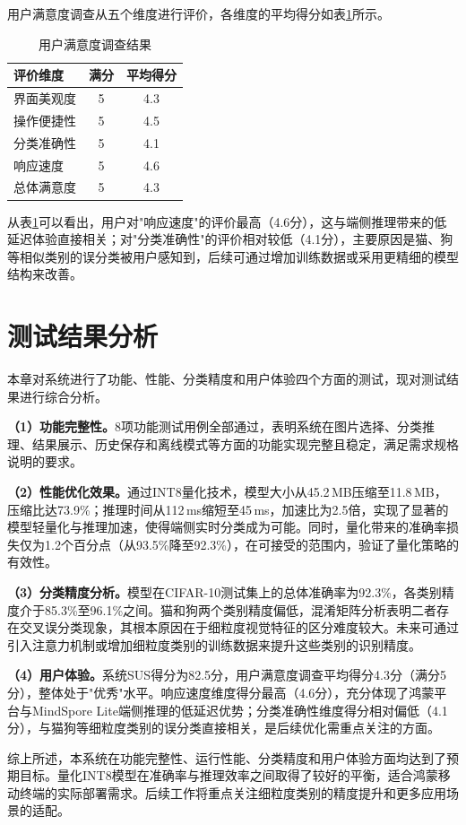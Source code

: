 用户满意度调查从五个维度进行评价，各维度的平均得分如表\ref{tab:satisfaction}所示。

\begin{table}[htbp]
\centering
\caption{用户满意度调查结果}
\label{tab:satisfaction}
\begin{tabular}{lcc}
\toprule
评价维度 & 满分 & 平均得分 \\
\midrule
界面美观度 & 5 & 4.3 \\
操作便捷性 & 5 & 4.5 \\
分类准确性 & 5 & 4.1 \\
响应速度 & 5 & 4.6 \\
总体满意度 & 5 & 4.3 \\
\bottomrule
\end{tabular}
\end{table}

从表\ref{tab:satisfaction}可以看出，用户对"响应速度"的评价最高（4.6分），这与端侧推理带来的低延迟体验直接相关；对"分类准确性"的评价相对较低（4.1分），主要原因是猫、狗等相似类别的误分类被用户感知到，后续可通过增加训练数据或采用更精细的模型结构来改善。

\section{测试结果分析}

本章对系统进行了功能、性能、分类精度和用户体验四个方面的测试，现对测试结果进行综合分析。

\textbf{（1）功能完整性。}8项功能测试用例全部通过，表明系统在图片选择、分类推理、结果展示、历史保存和离线模式等方面的功能实现完整且稳定，满足需求规格说明的要求。

\textbf{（2）性能优化效果。}通过INT8量化技术，模型大小从45.2\,MB压缩至11.8\,MB，压缩比达73.9\%；推理时间从112\,ms缩短至45\,ms，加速比为2.5倍，实现了显著的模型轻量化与推理加速，使得端侧实时分类成为可能。同时，量化带来的准确率损失仅为1.2个百分点（从93.5\%降至92.3\%），在可接受的范围内，验证了量化策略的有效性。

\textbf{（3）分类精度分析。}模型在CIFAR-10测试集上的总体准确率为92.3\%，各类别精度介于85.3\%至96.1\%之间。猫和狗两个类别精度偏低，混淆矩阵分析表明二者存在交叉误分类现象，其根本原因在于细粒度视觉特征的区分难度较大。未来可通过引入注意力机制或增加细粒度类别的训练数据来提升这些类别的识别精度。

\textbf{（4）用户体验。}系统SUS得分为82.5分，用户满意度调查平均得分4.3分（满分5分），整体处于"优秀"水平。响应速度维度得分最高（4.6分），充分体现了鸿蒙平台与MindSpore Lite端侧推理的低延迟优势；分类准确性维度得分相对偏低（4.1分），与猫狗等细粒度类别的误分类直接相关，是后续优化需重点关注的方面。

综上所述，本系统在功能完整性、运行性能、分类精度和用户体验方面均达到了预期目标。量化INT8模型在准确率与推理效率之间取得了较好的平衡，适合鸿蒙移动终端的实际部署需求。后续工作将重点关注细粒度类别的精度提升和更多应用场景的适配。